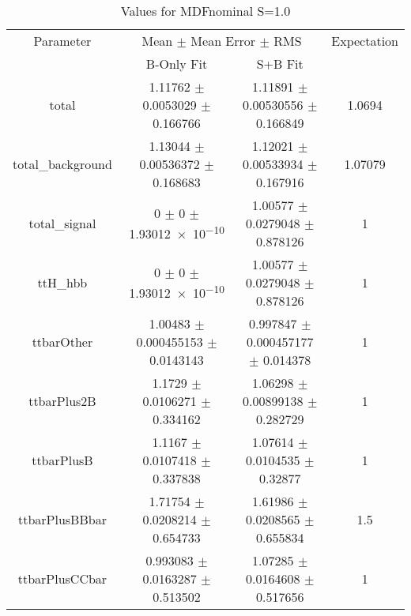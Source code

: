\begin{table}
\centering
\caption{Values for MDFnominal S=1.0}
\begin{tabular}{cccc}
\toprule
Parameter & \multicolumn{2}{c}{Mean $\pm$ Mean Error $\pm$ RMS} & Expectation\\
 & B-Only Fit & S+B Fit & \\
\midrule
total & \num{1.11762} $\pm$ \num{0.0053029} $\pm$ \num{0.166766} & \num{1.11891} $\pm$ \num{0.00530556} $\pm$ \num{0.166849} & \num{1.0694}\\
total\_background & \num{1.13044} $\pm$ \num{0.00536372} $\pm$ \num{0.168683} & \num{1.12021} $\pm$ \num{0.00533934} $\pm$ \num{0.167916} & \num{1.07079}\\
total\_signal & \num{0} $\pm$ \num{0} $\pm$ \num{1.93012e-10} & \num{1.00577} $\pm$ \num{0.0279048} $\pm$ \num{0.878126} & \num{1}\\
ttH\_hbb & \num{0} $\pm$ \num{0} $\pm$ \num{1.93012e-10} & \num{1.00577} $\pm$ \num{0.0279048} $\pm$ \num{0.878126} & \num{1}\\
ttbarOther & \num{1.00483} $\pm$ \num{0.000455153} $\pm$ \num{0.0143143} & \num{0.997847} $\pm$ \num{0.000457177} $\pm$ \num{0.014378} & \num{1}\\
ttbarPlus2B & \num{1.1729} $\pm$ \num{0.0106271} $\pm$ \num{0.334162} & \num{1.06298} $\pm$ \num{0.00899138} $\pm$ \num{0.282729} & \num{1}\\
ttbarPlusB & \num{1.1167} $\pm$ \num{0.0107418} $\pm$ \num{0.337838} & \num{1.07614} $\pm$ \num{0.0104535} $\pm$ \num{0.32877} & \num{1}\\
ttbarPlusBBbar & \num{1.71754} $\pm$ \num{0.0208214} $\pm$ \num{0.654733} & \num{1.61986} $\pm$ \num{0.0208565} $\pm$ \num{0.655834} & \num{1.5}\\
ttbarPlusCCbar & \num{0.993083} $\pm$ \num{0.0163287} $\pm$ \num{0.513502} & \num{1.07285} $\pm$ \num{0.0164608} $\pm$ \num{0.517656} & \num{1}\\
\bottomrule
\end{tabular}
\end{table}